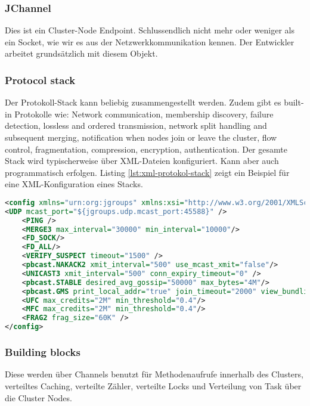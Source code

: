 \subsubsection{JChannel}

Dies ist ein Cluster-Node Endpoint. Schlussendlich nicht mehr oder weniger als ein Socket, wie wir es aus der Netzwerkkommunikation kennen. Der Entwickler arbeitet grundsätzlich mit diesem Objekt.
	
\subsubsection{Protocol stack} 

Der Protokoll-Stack kann beliebig zusammengestellt werden. Zudem gibt es built-in Protokolle wie: Network communication, membership discovery, failure detection, lossless and ordered transmission, network split handling and subsequent merging, notification when nodes join or leave the cluster, flow control, fragmentation, compression, encryption, authentication. Der gesamte Stack wird typischerweise über XML-Dateien konfiguriert. Kann aber auch programmatisch erfolgen. Listing \ref{lst:xml-protokol-stack} zeigt ein Beispiel für eine XML-Konfiguration eines Stacks.
	
\begin{lstlisting}[language=XML, caption=XML für Protokoll Stack, label=lst:xml-protokol-stack]
<config xmlns="urn:org:jgroups" xmlns:xsi="http://www.w3.org/2001/XMLSchema-instance" xsi:schemaLocation="urn:org:jgroups	http://www.jgroups.org/schema/jgroups.xsd">
<UDP mcast_port="${jgroups.udp.mcast_port:45588}" />
	<PING />
	<MERGE3 max_interval="30000" min_interval="10000"/>
	<FD_SOCK/>
	<FD_ALL/>
	<VERIFY_SUSPECT timeout="1500" />
	<pbcast.NAKACK2 xmit_interval="500" use_mcast_xmit="false"/>
	<UNICAST3 xmit_interval="500" conn_expiry_timeout="0" />
	<pbcast.STABLE desired_avg_gossip="50000" max_bytes="4M"/>
	<pbcast.GMS print_local_addr="true" join_timeout="2000" view_bundling="true"/>
	<UFC max_credits="2M" min_threshold="0.4"/>
	<MFC max_credits="2M" min_threshold="0.4"/>
	<FRAG2 frag_size="60K" />
</config>
\end{lstlisting}

\subsubsection{Building blocks} 

Diese werden über Channels benutzt für Methodenaufrufe innerhalb des Clusters, verteiltes Caching, verteilte Zähler, verteilte Locks und Verteilung von Task über die Cluster Nodes.

